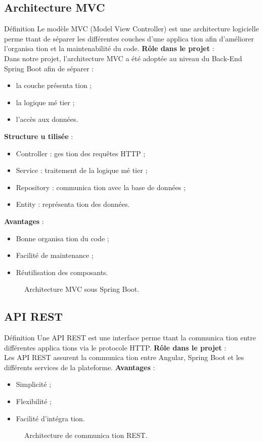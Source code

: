 \documentclass[12pt,a4paper]{report}
\numberwithin{figure}{chapter}
\numberwithin{table}{chapter}
\begin{document}
\subsection{Architecture MVC}
Déﬁnition
Le modèle MVC (Model View Controller) est une architecture logicielle perme ttant de séparer les
diﬀérentes couches d’une applica tion aﬁn d’améliorer l’organisa tion et la maintenabilité du code.
\textbf{Rôle dans le projet} : \\
Dans notre projet, l’architecture MVC a été adoptée au niveau du Back-End Spring Boot aﬁn de
séparer :
\begin{itemize}
  \item la couche présenta tion ;
  \item la logique mé tier ;
  \item l’accès aux données.
\end{itemize}
\textbf{Structure u tilisée} : \\
\begin{itemize}
  \item Controller : ges tion des requêtes HTTP ;
  \item Service : traitement de la logique mé tier ;
  \item Repository : communica tion avec la base de données ;
  \item Entity : représenta tion des données.
\end{itemize}
\textbf{Avantages} : \\
\begin{itemize}
  \item Bonne organisa tion du code ;
  \item Facilité de maintenance ;
  \item Réutilisation des composants.
\end{itemize}
\begin{figure}[H]
  \centering
  \caption{Architecture MVC sous Spring Boot.}
\end{figure}
\subsection{API REST}
Déﬁnition
Une API REST est une interface perme ttant la communica tion entre diﬀérentes applica tions via le
protocole HTTP.
\textbf{Rôle dans le projet} : \\
Les API REST assurent la communica tion entre Angular, Spring Boot et les diﬀérents services de la
plateforme.
\textbf{Avantages} : \\
\begin{itemize}
  \item Simplicité ;
  \item Flexibilité ;
  \item Facilité d’intégra tion.
\end{itemize}
\begin{figure}[H]
  \centering
  \caption{Architecture de communica tion REST.}
\end{figure}
\end{document}
